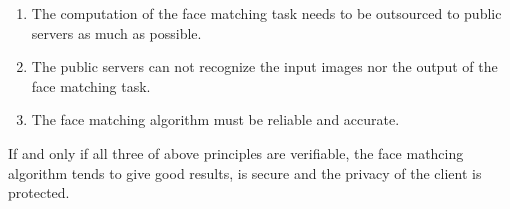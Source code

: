 \begin{enumerate}
\item The computation of the face matching task needs to be outsourced to public servers as much as possible.
\item The public servers can not recognize the input images nor the output of the face matching task.
\item The face matching algorithm must be reliable and accurate.
\end{enumerate}

If and only if all three of above principles are verifiable, the face mathcing algorithm tends to give good results, is secure and the privacy of the client is protected.
